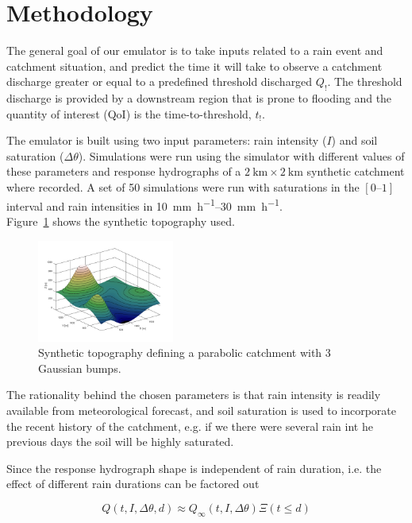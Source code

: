\documentclass[12pt,a4paper,english,twocolumn,fleqn]{narms}
\begin{document}
\section{Methodology}

The general goal of our emulator is to take inputs related to a rain event and catchment situation, and predict the time it will take to observe a catchment discharge greater or equal to a predefined threshold discharged $Q_!$.
The threshold discharge is provided by a downstream region that is prone to flooding and the quantity of interest (QoI) is the time-to-threshold, $t_!$.

The emulator is built using two input parameters: rain intensity ($I$) and soil saturation ($\Delta\theta$).
Simulations were run using the simulator with different values of these parameters and response hydrographs of a $\SI{2}{\kilo\metre} \times \SI{2}{\kilo\metre}$ synthetic catchment where recorded.
A set of \num{50} simulations were run with saturations in the $[\numrange{0}{1}]$ interval
and rain intensities in \SIrange{10}{30}{\milli\metre\per\hour}.\\
Figure~\ref{img:topography} shows the synthetic topography used.

\begin{figure}[htpb]
  \centering
  \includegraphics[width=0.4\textwidth]{img/topography.png}
  \caption{Synthetic topography defining a parabolic catchment with \num{3} Gaussian bumps.}
  \label{img:topography}
\end{figure}

The rationality behind the chosen parameters is that rain intensity is readily available from meteorological forecast, and soil saturation is used to incorporate the recent history of the catchment, e.g. if we there were several rain int he previous days the soil will be highly saturated.

Since the response hydrograph shape is independent of rain duration, i.e. the effect of different rain durations can be factored out

\begin{equation}
Q(t, I, \Delta\theta, d) \approx Q_\infty(t, I, \Delta\theta) \Xi(t \leq d)
\end{equation}
\end{document}

